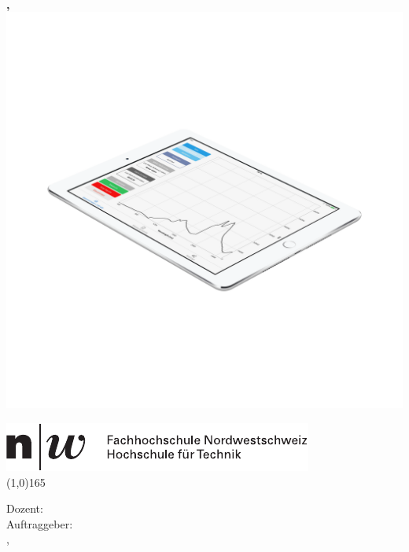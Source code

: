 \thispagestyle{plain}

\begin{titlepage}
	\begin{center}
		\vspace*{1cm}
		\textbf{
			\hspace{-0.12cm}\LARGE{\doctype}\\
			\Huge{\titel}\\
			\vspace{0.5cm}
			\large{\untertitel}\\
			\vspace{1.5cm}
			\large{\autorA, \autorB}\\
		}
		\includegraphics[scale=0.16]{images/ipadAir_Spektrometer}
		\vfill
		\large{
			\hspace{-0.83cm} \includegraphics{images/fhnw_logo}\\
			\line(1,0){165}	

			\vspace{0.5cm}
			Dozent: \dozent \\
			\vspace{0.1cm}
			Auftraggeber:  \auftraggeber \\
			\vspace{0.5cm}
			\ort, \datum
		}
	\end{center}
\end{titlepage}